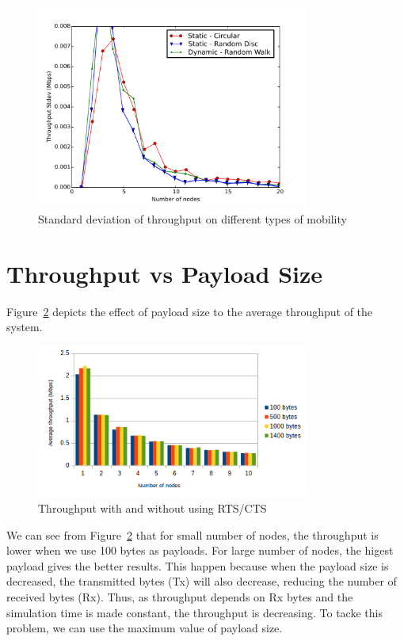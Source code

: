 \begin{figure}[H]
    \centering
    \includegraphics[width=0.8\textwidth]{figures/std-combine}
    \caption{Standard deviation of throughput on different types of mobility}
    \label{fig:std-combine}
\end{figure}

\section{Throughput vs Payload Size}

Figure~\ref{fig:payloads} depicts the effect of payload size to the average throughput of the system.

\begin{figure}[H]
    \centering
    \includegraphics[width=0.8\textwidth]{figures/payloads}
    \caption{Throughput with and without using RTS/CTS}
    \label{fig:payloads}
\end{figure}

We can see from Figure~\ref{fig:payloads} that for small number of nodes, the throughput is lower when we use 100 bytes as payloads. For large number of nodes, the higest payload gives the better results. This happen because when the payload size is decreased, the transmitted bytes (Tx) will also decrease, reducing the number of received bytes (Rx). Thus, as throughput depends on Rx bytes and the simulation time is made constant, the throughput is decreasing. To tacke this problem, we can use the maximum value of payload size.

